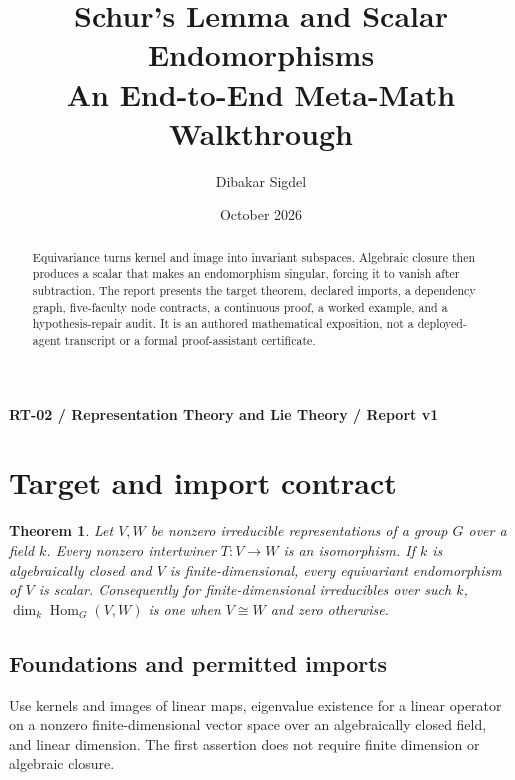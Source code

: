\documentclass[preprint,12pt,aps,pra,showkeys,amsmath,amssymb,superscriptaddress,floatfix]{revtex4-2}
\newtheorem{theorem}{Theorem}[section]
\theoremstyle{definition}
\theoremstyle{remark}
\begin{document}
\title{Schur's Lemma and Scalar Endomorphisms\\[4pt]\large An End-to-End Meta-Math Walkthrough}

\author{Dibakar Sigdel}


\date{October 2026}

\begin{abstract}

Equivariance turns kernel and image into invariant subspaces. Algebraic
closure then produces a scalar that makes an endomorphism singular,
forcing it to vanish after subtraction. The report presents the target
theorem, declared imports, a dependency graph, five-faculty node
contracts, a continuous proof, a worked example, and a hypothesis-repair
audit. It is an authored mathematical exposition, not a deployed-agent
transcript or a formal proof-assistant certificate.

\end{abstract}\maketitle\linespread{1.12}\selectfont

\noindent\textbf{RT-02 / Representation Theory and Lie Theory / Report v1}

\section{Target and import contract}

\begin{theorem}

Let \(V,W\) be nonzero irreducible representations of a group \(G\) over
a field \(k\). Every nonzero intertwiner \(T:V\to W\) is an isomorphism.
If \(k\) is algebraically closed and \(V\) is finite-dimensional, every
equivariant endomorphism of \(V\) is scalar. Consequently for
finite-dimensional irreducibles over such \(k\),
\(\dim_k\operatorname{Hom}_G(V,W)\) is one when \(V\cong W\) and zero
otherwise.

\end{theorem}

\subsection{Foundations and permitted imports}

Use kernels and images of linear maps, eigenvalue existence for a linear
operator on a nonzero finite-dimensional vector space over an
algebraically closed field, and linear dimension. The first assertion
does not require finite dimension or algebraic closure.
\end{document}
